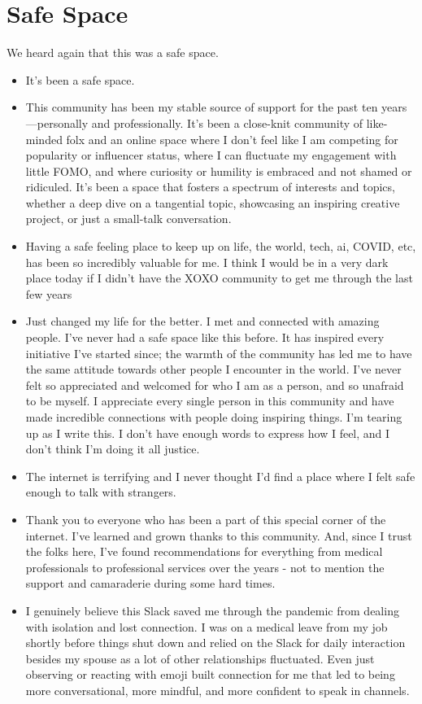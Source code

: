 \documentclass[
]{book}
\providecommand{\tightlist}{%
  \setlength{\itemsep}{0pt}\setlength{\parskip}{0pt}}
\begin{document}
\section{Safe Space}\label{safe-space}

We heard again that this was a safe space.

\begin{itemize}
\tightlist
\item
  It's been a safe space.
\item
  This community has been my stable source of support for the past ten years---personally and professionally. It's been a close-knit community of like-minded folx and an online space where I don't feel like I am competing for popularity or influencer status, where I can fluctuate my engagement with little FOMO, and where curiosity or humility is embraced and not shamed or ridiculed. It's been a space that fosters a spectrum of interests and topics, whether a deep dive on a tangential topic, showcasing an inspiring creative project, or just a small-talk conversation.
\item
  Having a safe feeling place to keep up on life, the world, tech, ai, COVID, etc, has been so incredibly valuable for me. I think I would be in a very dark place today if I didn't have the XOXO community to get me through the last few years
\item
  Just changed my life for the better. I met and connected with amazing people. I've never had a safe space like this before. It has inspired every initiative I've started since; the warmth of the community has led me to have the same attitude towards other people I encounter in the world. I've never felt so appreciated and welcomed for who I am as a person, and so unafraid to be myself. I appreciate every single person in this community and have made incredible connections with people doing inspiring things. I'm tearing up as I write this. I don't have enough words to express how I feel, and I don't think I'm doing it all justice.
\item
  The internet is terrifying and I never thought I'd find a place where I felt safe enough to talk with strangers.
\item
  Thank you to everyone who has been a part of this special corner of the internet. I've learned and grown thanks to this community. And, since I trust the folks here, I've found recommendations for everything from medical professionals to professional services over the years - not to mention the support and camaraderie during some hard times.
\item
  I genuinely believe this Slack saved me through the pandemic from dealing with isolation and lost connection. I was on a medical leave from my job shortly before things shut down and relied on the Slack for daily interaction besides my spouse as a lot of other relationships fluctuated. Even just observing or reacting with emoji built connection for me that led to being more conversational, more mindful, and more confident to speak in channels.
\end{itemize}
\end{document}
